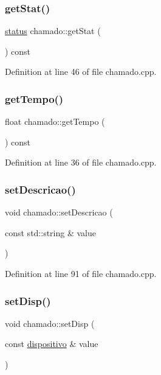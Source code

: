\subsubsection{\texorpdfstring{get\+Stat()}{getStat()}}
{\footnotesize\ttfamily \hyperlink{classstatus}{status} chamado\+::get\+Stat (\begin{DoxyParamCaption}{ }\end{DoxyParamCaption}) const}



Definition at line 46 of file chamado.\+cpp.

\hypertarget{classchamado_aca409a12317510d614f2766142e6e6cd}{}\label{classchamado_aca409a12317510d614f2766142e6e6cd} 
\subsubsection{\texorpdfstring{get\+Tempo()}{getTempo()}}
{\footnotesize\ttfamily float chamado\+::get\+Tempo (\begin{DoxyParamCaption}{ }\end{DoxyParamCaption}) const}



Definition at line 36 of file chamado.\+cpp.

\hypertarget{classchamado_a237f1aa14c584876728add1fe13adc61}{}\label{classchamado_a237f1aa14c584876728add1fe13adc61} 
\subsubsection{\texorpdfstring{set\+Descricao()}{setDescricao()}}
{\footnotesize\ttfamily void chamado\+::set\+Descricao (\begin{DoxyParamCaption}\item[{const std\+::string \&}]{value }\end{DoxyParamCaption})}



Definition at line 91 of file chamado.\+cpp.

\hypertarget{classchamado_a1552d8590d6fc4c19f385945c311bbb4}{}\label{classchamado_a1552d8590d6fc4c19f385945c311bbb4} 
\subsubsection{\texorpdfstring{set\+Disp()}{setDisp()}}
{\footnotesize\ttfamily void chamado\+::set\+Disp (\begin{DoxyParamCaption}\item[{const \hyperlink{classdispositivo}{dispositivo} \&}]{value }\end{DoxyParamCaption})}



